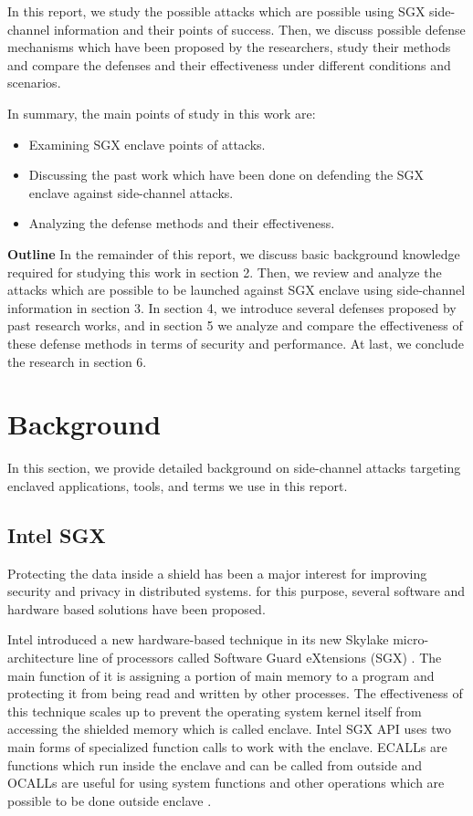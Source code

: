 In this report, we study the possible attacks which are possible using SGX side-channel information and their points of success. Then, we discuss possible defense mechanisms which have been proposed by the researchers, study their methods and compare the defenses and their effectiveness under different conditions and scenarios.

In summary, the main points of study in this work are:
\begin{itemize}
	\item Examining SGX enclave points of attacks.
	\item Discussing the past work which have been done on defending the SGX enclave against side-channel attacks.
	\item Analyzing the defense methods and their effectiveness.
\end{itemize} 
\textbf{Outline} In the remainder of this report, we discuss basic background knowledge required for studying this work in section 2. Then, we review and analyze the attacks which are possible to be launched against SGX enclave using side-channel information in section 3. In section 4, we introduce several defenses proposed by past research works, and in section 5 we analyze and compare the effectiveness of these defense methods in terms of security and performance. At last, we conclude the research in section 6.
\section{Background}
In this section, we provide detailed background on side-channel attacks targeting enclaved applications, tools, and terms we use in this report.

\subsection{Intel SGX}

Protecting the data inside a shield has been a major interest for improving security and privacy in distributed systems. for this purpose, several software and hardware based solutions have been proposed.

Intel introduced a new hardware-based technique in its new Skylake micro-architecture \cite{skylake} line of processors called Software Guard eXtensions (SGX) \cite{sgx}. The main function of it is assigning a portion of main memory to a program and protecting it from being read and written by other processes. The effectiveness of this technique scales up to prevent the operating system kernel itself from accessing the shielded memory which is called enclave. Intel SGX API \cite{sgxapi} uses two main forms of specialized function calls to work with the enclave. ECALLs are functions which run inside the enclave and can be called from outside and OCALLs are useful for using system functions and other operations which are possible to be done outside enclave \cite{ecallocall}.

